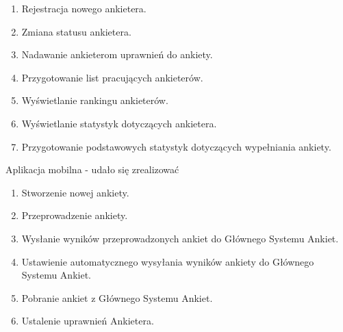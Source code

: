 \documentclass[a4paper,10pt]{beamer}
\begin{document}
		\begin{frame}
			\begin{enumerate}
				\item  Rejestracja nowego ankietera. 
				\item	Zmiana statusu ankietera. 
				\item	Nadawanie ankieterom uprawnień do ankiety.
				\item	Przygotowanie list pracujących ankieterów.
				\item	Wyświetlanie rankingu ankieterów.
				\item	Wyświetlanie statystyk dotyczących ankietera.
				\item	Przygotowanie podstawowych statystyk dotyczących wypełniania ankiety.
			\end{enumerate}
		\end{frame}
			
	
		\begin{frame}{Aplikacja mobilna - udało się zrealizować}
			\begin{enumerate}
				\item Stworzenie nowej ankiety. 
				\item	Przeprowadzenie ankiety. 
				\item	Wysłanie wyników przeprowadzonych ankiet do Głównego Systemu Ankiet. 
				\item	Ustawienie automatycznego wysyłania wyników ankiety do Głównego Systemu Ankiet.
				\item	Pobranie ankiet z Głównego Systemu Ankiet. 
				\item	Ustalenie uprawnień Ankietera.	
			\end{enumerate}
		\end{frame}
		
\end{document}
